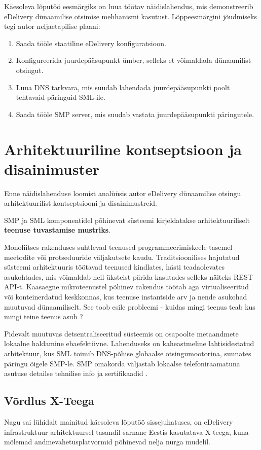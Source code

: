 Käesoleva lõputöö eesmärgiks on luua töötav näidislahendus, 
mis demonstreerib eDelivery dünaamilise otsimise mehhanismi kasutust.
Lõppeesmärgini jõudmiseks tegi autor neljaetapilise plaani:

\begin{enumerate}
  \item Saada tööle staatiline eDelivery konfiguratsioon.
  \item Konfigureerida juurdepääsupunkt ümber, selleks et võimaldada dünaamilist otsingut.
  \item Luua DNS tarkvara, mis suudab lahendada juurdepääsupunkti poolt tehtavaid päringuid SML-ile.
  \item Saada tööle SMP server, mis suudab vastata juurdepääsupunkti päringutele.
\end{enumerate}



\section{Arhitektuuriline kontseptsioon ja disainimuster}
Enne näidislahenduse loomist analüüsis autor eDelivery dünaamilise
otsingu arhitektuurilist kontseptsiooni ja disainimustreid.

SMP ja SML komponentidel põhinevat süsteemi kirjeldatakse arhitektuuriliselt
\textbf{teenuse tuvastamise mustriks}. 

Monoliitses rakenduses suhtlevad teenused programmeerimiskeele tasemel meetodite või
protseduuride väljakutsete kaudu. Traditsioonilises hajutatud süsteemi arhitektuuris töötavad
teenused kindlates, hästi teadaolevates asukohtades, mis võimaldab neil üksteist pärida 
kasutades selleks näiteks REST API-t. Kaasaegne mikroteenustel põhinev rakendus töötab aga 
virtualiseeritud või konteinerdatud keskkonnas, kus teenuse instantside arv ja nende asukohad 
muutuvad dünaamiliselt. See toob esile probleemi - kuidas mingi teenus teab kus mingi teine 
teenus asub \cite{microservices_server_side_discovery}?

Pidevalt muutuvas detsentraliseeritud süsteemis on osapoolte metaandmete lokaalne haldamine 
ebaefektiivne. Lahenduseks on kaheastmeline lahtisidestatud arhitektuur, kus SML toimib 
DNS-põhise globaalse otsingumootorina, suunates päringu õigele SMP-le. 
SMP omakorda väljastab lokaalse telefoniraamatuna asutuse detailse tehnilise info ja 
sertifikaadid \cite{ria_edelivery_selgitus}.

\subsection{Võrdlus X-Teega}
Nagu sai lühidalt mainitud käesoleva lõputöö sissejuhatuses, on eDelivery infrastruktuur
arhitektuursel tasandil sarnane Eestis kasutatava X-teega, kuna mõlemad
andmevahetusplatvormid põhinevad nelja nurga mudelil. 

